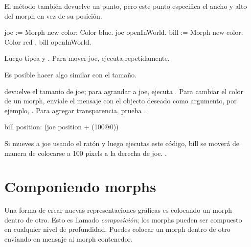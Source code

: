 \documentclass[a4paper,10pt,twoside]{book}
\begin{document}
El m\'etodo  tambi\'en devuelve un punto, pero este punto especifica el ancho y alto del morph en vez de su posici\'on.


\begin{code}{}
joe := Morph new color: Color blue.
joe openInWorld.
bill := Morph new color: Color red .
bill openInWorld.
\end{code}
\noindent
Luego tipea  y .
Para mover joe, ejecuta  repetidamente.

Es posible hacer algo similar con el tama\~no.

  devuelve el tamanio de joe; para agrandar a joe, ejecuta .
Para cambiar el color de un morph, env\'iale el mensaje  con el objecto  deseado como argumento, por ejemplo, .
Para agregar transparencia, prueba .

\begin{code}{}
bill position: (joe position + (100@0))
\end{code}
\noindent
Si mueves a joe usando el rat\'on y luego ejecutas este c\'odigo, bill se mover\'a de manera de colocarse a 100 pixels a la derecha de joe.
.

\section{Componiendo morphs}

Una forma de crear nuevas representaciones gr\'aficas es colocando un morph dentro de otro.
Esto es llamado \emph{composici\'on}; los morphs pueden ser compuesto en cualquier nivel de profundidad.
%
Puedes colocar un morph dentro de otro enviando en mensaje  al morph contenedor.
\end{document}
